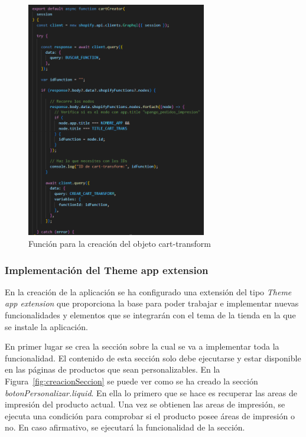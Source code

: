\documentclass[11pt]{article}
\begin{document}
\begin{figure}[H]
    \centering
    \includegraphics[width=0.7\textwidth]{imagenes-back/funcionCartCreator.png}
    \caption{\label{fig:funcioncartCreat} Función para la creación del objeto cart-transform}
    \vspace{\fill}
\end{figure}


\subsubsection{Implementación del Theme app extension}

En la creación de la aplicación se ha configurado una extensión del tipo \textit{Theme app extension} que proporciona la base para poder trabajar e implementar nuevas funcionalidades
y elementos que se integrarán con el tema de la tienda en la que se instale la aplicación.

En primer lugar se crea la sección sobre la cual se va a implementar toda la funcionalidad. El contenido de esta sección solo debe ejecutarse y estar disponible en las 
páginas de productos que sean personalizables. En la Figura~\ref{fig:creacionSeccion} se puede ver como se ha creado la sección \textit{botonPersonalizar.liquid}. En ella lo primero
que se hace es recuperar las areas de impresión del producto actual. Una vez se obtienen las areas de impresión, se ejecuta una condición para comprobar
si el producto posee áreas de impresión o no. En caso afirmativo, se ejecutará la funcionalidad de la sección.
\end{document}
